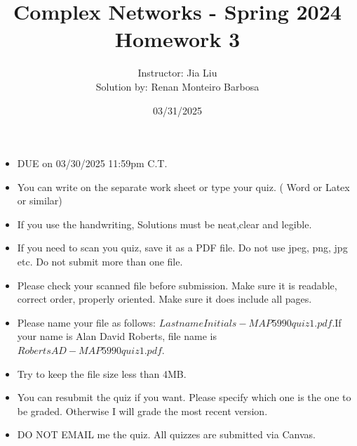 \documentclass{amsart}
\theoremstyle{definition}
\theoremstyle{remark}
\numberwithin{equation}{section}
\begin{document}
\title{Complex Networks  - Spring 2024\\{\bf Homework 3}}%
\author{Instructor: Jia Liu \\ Solution by: Renan Monteiro Barbosa}%
\date{03/31/2025}


\maketitle
\begin{itemize}
\item DUE on  03/30/2025 11:59pm C.T.
\item You can write on the separate work sheet or type your quiz. ( Word or Latex or similar)
\item If you use the handwriting, Solutions must be neat,clear and legible.
\item If you need to scan you quiz, save it as a PDF file. Do not use jpeg, png, jpg etc. Do not submit more than one file.
\item Please check your scanned file before submission. Make sure it is readable, correct order, properly oriented. Make sure it does include all pages.
\item Please name your file as follows: $LastnameInitials-MAP5990quiz1.pdf$.If your name is Alan David Roberts, file name is $RobertsAD-MAP5990quiz1.pdf$.
\item Try to keep the file size less than 4MB.
\item You can resubmit the quiz if you want. Please specify which one is the one to be graded. Otherwise I will grade the most recent version.
\item DO NOT EMAIL me the quiz. All quizzes are submitted via Canvas.
\end{itemize}
\end{document}
